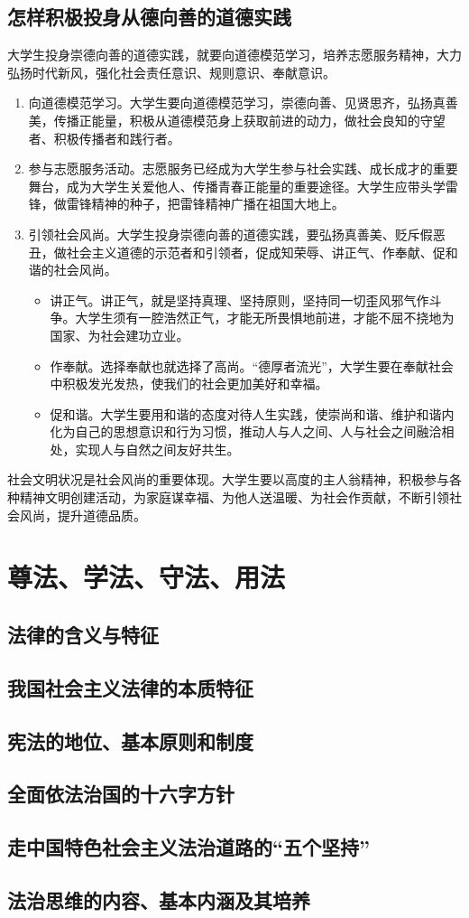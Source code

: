 \subsection{怎样积极投身从德向善的道德实践}
大学生投身崇德向善的道德实践，就要向道德模范学习，培养志愿服务精神，大力弘扬时代新风，强化社会责任意识、规则意识、奉献意识。
\begin{enumerate}
\item 向道德模范学习。大学生要向道德模范学习，崇德向善、见贤思齐，弘扬真善美，传播正能量，积极从道德模范身上获取前进的动力，做社会良知的守望者、积极传播者和践行者。
\item 参与志愿服务活动。志愿服务已经成为大学生参与社会实践、成长成才的重要舞台，成为大学生关爱他人、传播青春正能量的重要途径。大学生应带头学雷锋，做雷锋精神的种子，把雷锋精神广播在祖国大地上。
\item 引领社会风尚。大学生投身崇德向善的道德实践，要弘扬真善美、贬斥假恶丑，做社会主义道德的示范者和引领者，促成知荣辱、讲正气、作奉献、促和谐的社会风尚。
\begin{itemize}
\item 讲正气。讲正气，就是坚持真理、坚持原则，坚持同一切歪风邪气作斗争。大学生须有一腔浩然正气，才能无所畏惧地前进，才能不屈不挠地为国家、为社会建功立业。
\item 作奉献。选择奉献也就选择了高尚。“德厚者流光”，大学生要在奉献社会中积极发光发热，使我们的社会更加美好和幸福。
\item 促和谐。大学生要用和谐的态度对待人生实践，使崇尚和谐、维护和谐内化为自己的思想意识和行为习惯，推动人与人之间、人与社会之间融洽相处，实现人与自然之间友好共生。
\end{itemize}
\end{enumerate}

社会文明状况是社会风尚的重要体现。大学生要以高度的主人翁精神，积极参与各种精神文明创建活动，为家庭谋幸福、为他人送温暖、为社会作贡献，不断引领社会风尚，提升道德品质。

\section{尊法、学法、守法、用法}
\subsection{法律的含义与特征}
\subsection{我国社会主义法律的本质特征}
\subsection{宪法的地位、基本原则和制度}
\subsection{全面依法治国的十六字方针}
\subsection{走中国特色社会主义法治道路的“五个坚持”}
\subsection{法治思维的内容、基本内涵及其培养}
